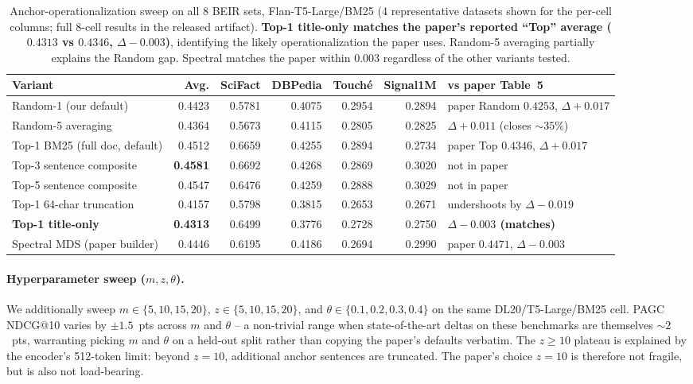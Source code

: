 \documentclass[sigconf]{acmart}
\begin{document}
\begin{table}[t]
\centering
\small
\setlength{\tabcolsep}{4pt}
\begin{tabular}{lrrrrr|l}
\toprule
\textbf{Variant} & \textbf{Avg.} & SciFact & DBPedia & Touch\'e & Signal1M
& \textbf{vs paper Table~5} \\
\midrule
Random-1 (our default)        & 0.4423 & 0.5781 & 0.4075 & 0.2954 & 0.2894 & paper Random $0.4253$, $\Delta{+}0.017$ \\
Random-5 averaging            & 0.4364 & 0.5673 & 0.4115 & 0.2805 & 0.2825 & $\Delta{+}0.011$ (closes $\sim 35\%$) \\
\midrule
Top-1 BM25 (full doc, default) & 0.4512 & 0.6659 & 0.4255 & 0.2894 & 0.2734 & paper Top $0.4346$, $\Delta{+}0.017$ \\
Top-3 sentence composite      & \textbf{0.4581} & 0.6692 & 0.4268 & 0.2869 & 0.3020 & not in paper \\
Top-5 sentence composite      & 0.4547 & 0.6476 & 0.4259 & 0.2888 & 0.3029 & not in paper \\
Top-1 64-char truncation      & 0.4157 & 0.5798 & 0.3815 & 0.2653 & 0.2671 & undershoots by $\Delta{-}0.019$ \\
\textbf{Top-1 title-only}     & \textbf{0.4313} & 0.6499 & 0.3776 & 0.2728 & 0.2750 & \textbf{$\Delta{-}0.003$ (matches)} \\
\midrule
Spectral MDS (paper builder)  & 0.4446 & 0.6195 & 0.4186 & 0.2694 & 0.2990 & paper $0.4471$, $\Delta{-}0.003$ \\
\bottomrule
\end{tabular}
\caption{Anchor-operationalization sweep on all 8 BEIR sets,
Flan-T5-Large/BM25 (4 representative datasets shown for the
per-cell columns; full 8-cell results in the released artifact).
\textbf{Top-1 title-only matches the paper's reported ``Top''
average ($0.4313$ vs $0.4346$, $\Delta{-}0.003$)}, identifying the
likely operationalization the paper uses. Random-5 averaging
partially explains the Random gap. Spectral matches the paper
within $0.003$ regardless of the other variants tested.}
\label{tab:beir-anchor-variants}
\end{table}

\paragraph{Hyperparameter sweep ($m, z, \theta$).} We additionally
sweep $m \in \{5, 10, 15, 20\}$, $z \in \{5, 10, 15, 20\}$, and
$\theta \in \{0.1, 0.2, 0.3, 0.4\}$ on the same DL20/T5-Large/BM25
cell. PAGC NDCG@10 varies by $\pm 1.5$~pts across $m$ and $\theta$
-- a non-trivial range when state-of-the-art deltas on these
benchmarks are themselves $\sim 2$~pts, warranting picking $m$ and
$\theta$ on a held-out split rather than copying the paper's
defaults verbatim. The $z \geq 10$ plateau is explained by the
encoder's 512-token limit: beyond $z=10$, additional anchor
sentences are truncated. The paper's choice $z=10$ is therefore
not fragile, but is also not load-bearing.
\end{document}
